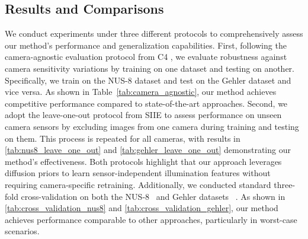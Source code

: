 







\subsection{Results and Comparisons}


We conduct experiments under three different protocols to comprehensively assess our method's performance and generalization capabilities. 
First, following the camera-agnostic evaluation protocol from C4 \cite{yu2020cascading}, we evaluate robustness against camera sensitivity variations by training on one dataset and testing on another. Specifically, we train on the NUS-8 dataset and test on the Gehler dataset and vice versa. As shown in Table~\ref{tab:camera_agnostic}, our method achieves competitive performance compared to state-of-the-art approaches.
Second, we adopt the leave-one-out protocol from SIIE \cite{afifi2019sensor} to assess performance on unseen camera sensors by excluding images from one camera during training and testing on them. This process is repeated for all cameras, with results in \cref{tab:nus8_leave_one_out} and \cref{tab:gehler_leave_one_out} demonstrating our method's effectiveness. Both protocols highlight that our approach leverages diffusion priors to learn sensor-independent illumination features without requiring camera-specific retraining.
Additionally, we conducted standard three-fold cross-validation on both the NUS-8~\cite{cheng2014illuminant} and Gehler datasets~\cite{4587765}
. As shown in \cref{tab:cross_validation_nus8} and \cref{tab:cross_validation_gehler}, our method achieves performance comparable to other approaches, particularly in worst-case scenarios.

